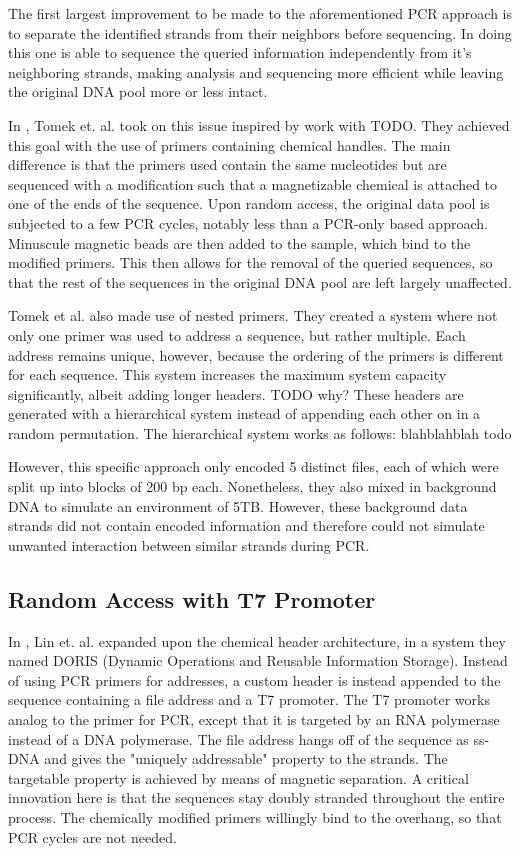\documentclass[a4paper,conference]{IEEEtran}
\begin{document}
The first largest improvement to be made to the aforementioned PCR approach is to separate the identified strands from their neighbors before sequencing. In doing this one is able to sequence the queried information independently from it's neighboring strands, making analysis and sequencing more efficient while leaving the original DNA pool more or less intact.

In \cite{}, Tomek et. al. took on this issue inspired by \cite{} work with TODO. They achieved this goal with the use of primers containing chemical handles. The main difference is that the primers used contain the same nucleotides but are sequenced with a modification such that a magnetizable chemical is attached to one of the ends of the sequence. Upon random access, the original data pool is subjected to a few PCR cycles, notably less than a PCR-only based approach. Minuscule magnetic beads are then added to the sample, which bind to the modified primers. This then allows for the removal of the queried sequences, so that the rest of the sequences in the original DNA pool are left largely unaffected.

Tomek et al. also made use of nested primers. They created a system where not only one primer was used to address a sequence, but rather multiple. Each address remains unique, however, because the ordering of the primers is different for each sequence. This system increases the maximum system capacity significantly, albeit adding longer headers. TODO why? These headers are generated with a hierarchical system instead of appending each other on in a random permutation. The hierarchical system works as follows: blahblahblah todo

However, this specific approach only encoded 5 distinct files, each of which were split up into blocks of 200 bp each. Nonetheless, they also mixed in background DNA to simulate an environment of 5TB. However, these background data strands did not contain encoded information and therefore could not simulate unwanted interaction between similar strands during PCR.

\subsection{Random Access with T7 Promoter}
In \cite{}, Lin et. al. expanded upon the chemical header architecture, in a system they named DORIS (Dynamic Operations and Reusable Information Storage). Instead of using PCR primers for addresses, a custom header is instead appended to the sequence containing a file address and a T7 promoter. The T7 promoter works analog to the primer for PCR, except that it is targeted by an RNA polymerase instead of a DNA polymerase. The file address hangs off of the sequence as ss-DNA and gives the "uniquely addressable" property to the strands. The targetable property is achieved by means of magnetic separation. A critical innovation here is that the sequences stay doubly stranded throughout the entire process. The chemically modified primers willingly bind to the overhang, so that PCR cycles are not needed. 
\end{document}
